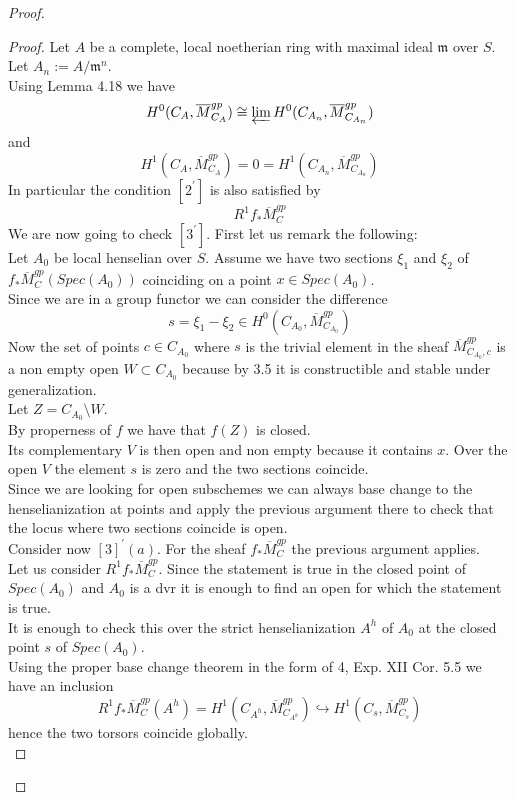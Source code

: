 \documentclass{amsart}
\theoremstyle{definition}
\numberwithin{equation}{section}
\begin{document}
\begin{proof}
\begin{proof}
\noindent Let $A$ be a complete, local noetherian ring with maximal ideal $\mathfrak{m}$ over $S$. Let $A_n:=A/\mathfrak{m}^n$. \\
Using \cite{olpic} Lemma 4.18 we have  
$$
H^0(C_A,\overline{M}_{C_A}^{gp})\cong \varprojlim H^0(C_{A_n},\overline{M}_{C_{A_n}}^{gp})
$$
\noindent and 
\begin{equation}\label{r1fdef}
H^1(C_A,\overline{M}_{C_A}^{gp})=0=H^1(C_{A_n},\overline{M}_{C_{A_n}}^{gp})
\end{equation}
\noindent In particular the condition $[2^{\prime}]$ is also satisfied by
$$
R^1f_{*}\overline{M}_C^{gp}
$$
\noindent We are now going to check $[3^{\prime}]$.
First let us remark the following:\\
Let $A_0$ be local henselian over $S$. Assume we have two sections $\xi_1$ and $\xi_2$ of $f_{*}\overline{M}_C^{gp}(Spec(A_0))$ coinciding on a point $x\in Spec(A_0)$.\\
Since we are in a group functor we can consider the difference
$$
s=\xi_1-\xi_2\in H^0(C_{A_0},\overline{M}_{C_{A_0}}^{gp})
$$
\noindent Now the set of points $c\in C_{A_0}$ where $s$ is the trivial element in the sheaf $\overline{M}_{C_{A_0},c}^{gp}$ is a non empty open $W\subset C_{A_0}$ because by \cite{ollog} 3.5 it is constructible and stable under generalization. \\
Let $Z=C_{A_0}\setminus W$.\\
By properness of $f$ we have that $f(Z)$ is closed.\\ Its complementary $V$ is then open and non empty because it contains $x$. Over the open $V$ the element $s$ is zero and the two sections coincide.\\
Since we are looking for open subschemes we can always base change to the henselianization at points and apply the previous argument there to check that the locus where two sections coincide is open.\\
Consider now $[3]^{\prime}(a)$. For the sheaf $f_{*}\overline{M}_C^{gp}$ the previous argument applies.\\
Let us consider $R^1f_{*}\overline{M}_C^{gp}$. Since the statement is true in the closed point of $Spec(A_0)$ and $A_0$ is a dvr it is enough to find an open for which the statement is true. \\
It is enough to check this over the strict henselianization $A^h$ of $A_0$ at the closed point $s$ of $Spec(A_0)$. \\
Using the proper base change theorem in the form of \cite{sga} 4, Exp. XII Cor. 5.5 we have an inclusion
$$
R^1f_{*}\overline{M}_C^{gp}(A^h)=H^1(C_{A^h}, \overline{M}_{C_{A^h}}^{gp})\hookrightarrow H^1(C_{s}, \overline{M}_{C_s}^{gp})
$$
\noindent hence the two torsors coincide globally.\\


\end{proof}
\end{proof}
\end{document}
